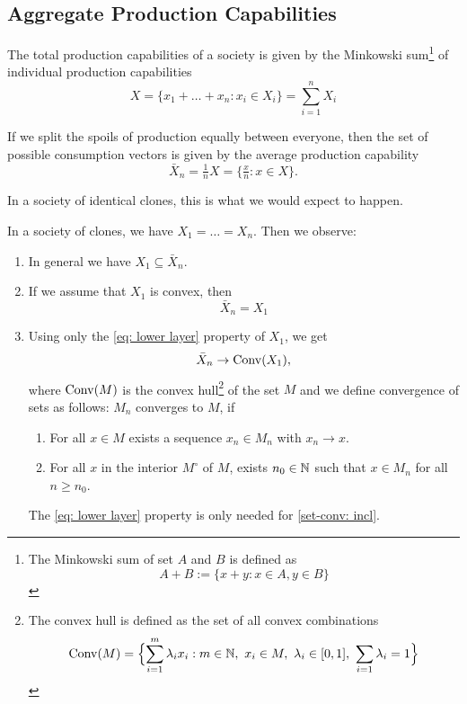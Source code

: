 \subsection{Aggregate Production Capabilities}

The total production capabilities of a society is given by the Minkowski sum\footnote{
	The Minkowski sum of set \(A\) and \(B\) is defined as
	\[
		A + B := \{ x+y : x\in A, y\in B\}
	\]
}
of individual production capabilities
\begin{equation}
	\label{eq: tpc}\tag{TPC}
	X = \{ x_1 + \dots + x_n : x_i \in X_i\} = \sum_{i=1}^n X_i
\end{equation}

If we split the spoils of production equally between everyone, then the set of
possible consumption vectors is given by the average production capability
\begin{equation}
	\label{eq: apc}\tag{APC}
	\bar{X}_n = \tfrac1n X = \{\tfrac{x}n : x\in X\}.
\end{equation}

In a society of identical clones, this is what we would expect to happen.

\begin{lemma}
	In a society of clones, we have \(X_1=\dots = X_n\). Then we observe:
	\begin{enumerate}
		\item In general we have \(X_1\subseteq \bar{X}_n\).
		\item If we assume that \(X_1\) is convex, then
		\[
			\bar{X}_n = X_1
		\]
		\item Using only the \ref{eq: lower layer} property of \(X_1\), we get
		\[
			\bar{X}_n \to \operatorname{Conv}(X_1),
		\]
		where \(\operatorname{Conv}(M)\) is the convex hull\footnote{
			The convex hull is defined as the set of all convex combinations
			\[
				\conv(M)= \Bigl\{\sum_{i=1}^m \lambda_i x_i : m\in\nat,\ x_i \in M,\ \lambda_i\in[0,1],\ \sum_{i=1}\lambda_i =1\Bigr\}
			\]
		} of the set \(M\) and we define
		convergence of sets as follows: \(M_n\) converges to \(M\), if

		\begin{enumerate}
			\item\label{set-conv: seq} For all \(x\in M\) exists a sequence
			\(x_n\in M_n\) with \(x_n\to x\).

			\item\label{set-conv: incl} For all \(x\) in the interior \(M^\circ\)
			of \(M\), exists \(n_0\in\mathbb{N}\) such that \(x\in M_n\) for all \(n\ge
			n_0\).
		\end{enumerate}
		The \ref{eq: lower layer} property is only needed for \ref{set-conv:
		incl}.
	\end{enumerate}
\end{lemma}


